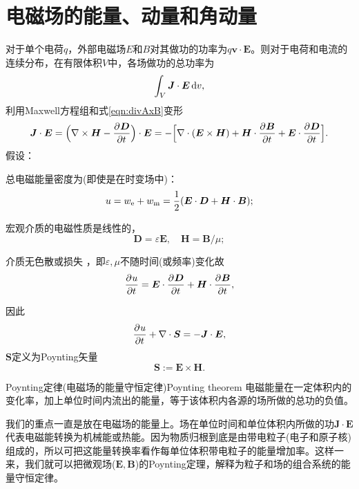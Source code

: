 \section{电磁场的能量、动量和角动量}
对于单个电荷$q$，外部电磁场$E$和$B$对其做功的功率为$q\bm v\cdot\bm E$。则对于电荷和电流的连续分布，在有限体积$V$中，各场做功的总功率为
\[
    \int_V\bm J\cdot\bm E\mathop{}\!\mathrm{d} v,
\]
利用Maxwell方程组和式\eqref{eqn:divAxB}变形
\[
    \bm J\cdot\bm E=\Bigl(\nabla\times\bm H-\frac{\partial^{{}}\bm D}{\partial{t}^{{}}}\Bigr)\cdot\bm E=-\Bigl[\nabla\cdot(\bm E\times\bm H)+\bm H\cdot\frac{\partial^{{}}\bm B}{\partial{t}^{{}}}+\bm E\cdot\frac{\partial^{{}}\bm D}{\partial{t}^{{}}}\Bigr].
\]
假设：
\begin{compactenum}
    \item 总电磁能量密度为(即使是在时变场中)：
    \[
        u=w_\elc+w_\text m=\frac12(\bm E\cdot\bm D+\bm H\cdot\bm B);%
    \]
	\item 宏观介质的电磁性质是线性的，
    \[
        \bm D=\varepsilon\bm E,\quad\bm H=\bm B/\mu;
    \]
    \item 介质无色散或损失%
    ，即$\varepsilon,\mu$不随时间(或频率)变化故
    \[
        \frac{\partial^{{}}u}{\partial{t}^{{}}}=\bm E\cdot\frac{\partial^{{}}\bm D}{\partial{t}^{{}}}+\bm H\cdot\frac{\partial^{{}}\bm B}{\partial{t}^{{}}},
    \]
\end{compactenum}
因此 
\begin{align}
    \frac{\partial^{{}}u}{\partial{t}^{{}}}+\nabla\cdot\bm S=-\bm J\cdot\bm E,
\end{align}
$\bm S$定义为Poynting矢量
\begin{equation}
    \bm S:=\bm E\times\bm H.
\end{equation}
\begin{theorem}{Poynting定律(电磁场的能量守恒定律)}{Poynting theorem}
    电磁能量在一定体积内的变化率，加上单位时间内流出的能量，等于该体积内各源的场所做的总功的负值。
\end{theorem}
我们的重点一直是放在电磁场的能量上。场在单位时间和单位体积内所做的功$\bm J\cdot\bm E$代表电磁能转换为机械能或热能。因为物质归根到底是由带电粒子(电子和原子核)组成的，所以可把这能量转换率看作每单位体积带电粒子的能量增加率。这样一来，我们就可以把微观场($\bm E,\bm B$)的Poynting定理，解释为粒子和场的组合系统的能量守恒定律。%
